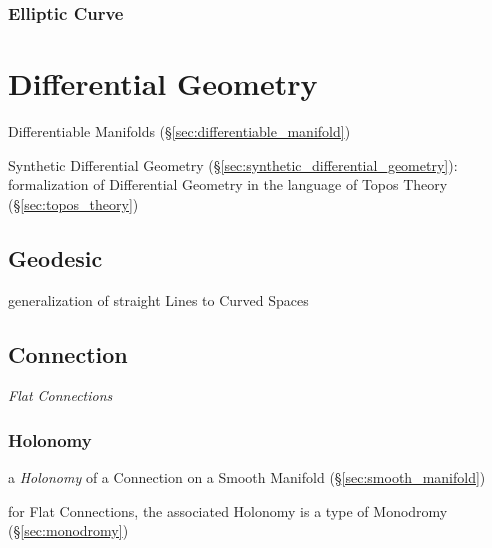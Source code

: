 \subsubsection{Elliptic Curve}\label{sec:elliptic_curve}



\section{Differential Geometry}\label{sec:differential_geometry}

Differentiable Manifolds (\S\ref{sec:differentiable_manifold})

\fist Synthetic Differential Geometry
(\S\ref{sec:synthetic_differential_geometry}): formalization of Differential
Geometry in the language of Topos Theory (\S\ref{sec:topos_theory})



\subsection{Geodesic}\label{sec:geodesic}

generalization of straight Lines to Curved Spaces



\subsection{Connection}\label{sec:connection}

\emph{Flat Connections} %



\subsubsection{Holonomy}\label{sec:holonomy}

a \emph{Holonomy} of a Connection on a Smooth Manifold
(\S\ref{sec:smooth_manifold})

for Flat Connections, the associated Holonomy is a type of Monodromy
(\S\ref{sec:monodromy})



